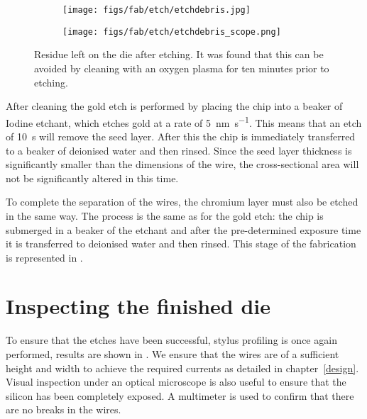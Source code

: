 \begin{figure}
  \centering
  \begin{subfigure}[b]{0.45\textwidth}
    \texttt{[image: figs/fab/etch/etchdebris.jpg]}
    \caption{}
  \end{subfigure}
  \hspace{1cm}
  \begin{subfigure}[b]{0.45\textwidth}
    \centering
    \texttt{[image: figs/fab/etch/etchdebris\_scope.png]}
    \caption{}
  \end{subfigure}
  \caption{Residue left on the die after etching. It was found that this can be
  avoided by cleaning with an oxygen plasma for ten minutes prior to etching.}
  \label{fab:fig:etchres}
\end{figure}

%
After cleaning the gold etch is performed by placing the chip into a beaker of
Iodine etchant, which etches gold at a rate of \SI{5}{\nano\meter\per\second}.
This means that an etch of \SI{10}{\second} will remove the seed layer. After
this the chip is immediately transferred to a beaker of deionised water and
then rinsed. Since the seed layer thickness is significantly smaller than the
dimensions of the wire, the cross-sectional area will not be significantly
altered in this time.

%
To complete the separation of the wires, the chromium layer must also be etched
in the same way. The process is the same as for the gold etch: the chip is
submerged in a beaker of the etchant and after the pre-determined exposure time
it is transferred to deionised water and then rinsed. This stage of the
fabrication is represented in . 

\section{Inspecting the finished die}

To ensure that the etches have been successful, stylus profiling is once again
performed, results are shown in . We ensure that
the wires are of a sufficient height and width to achieve the required currents
as detailed in chapter~\ref{design}. Visual inspection under an optical
microscope is also useful to ensure that the silicon has been completely
exposed. A multimeter is used to confirm that there are no breaks in the wires.

